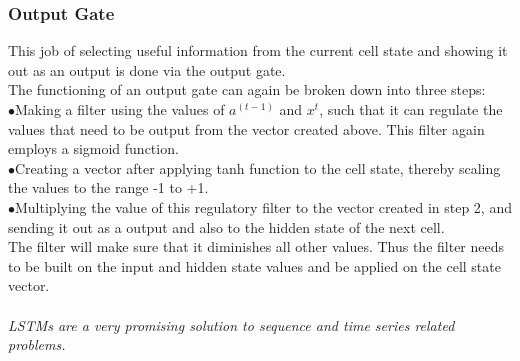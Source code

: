   \subsubsection{Output Gate}
  This job of selecting useful information from the current cell state and showing it out as an output is done via the output gate.\\The functioning of an output gate can again be broken down into three steps:\\
\indent$\bullet$Making a filter using the values of $a^{(t-1)}$ and $x^t$, such that it can regulate the values that need to be output from the vector created above. This filter again employs a sigmoid function.\\
\indent$\bullet$Creating a vector after applying tanh function to the cell state, thereby scaling the values to the range -1 to +1.\\
\indent$\bullet$Multiplying the value of this regulatory filter to the vector created in step 2, and sending it out as a output and also to the hidden state of the next cell.\\
The filter will make sure that it diminishes all other values. Thus the filter needs to be built on the input and hidden state values and be applied on the cell state vector.\\\\
\textit{LSTMs are a very promising solution to sequence and time series related problems.}